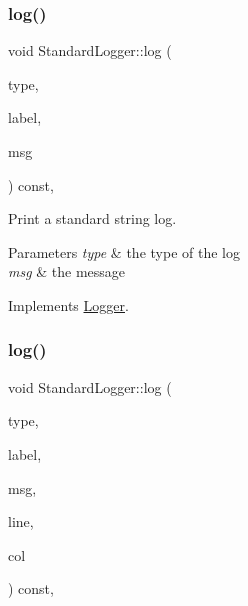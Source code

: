 \subsubsection{\texorpdfstring{log()}{log()}\hspace{0.1cm}{\footnotesize\ttfamily [1/2]}}
{\footnotesize\ttfamily void Standard\+Logger\+::log (\begin{DoxyParamCaption}\item[{const \mbox{\hyperlink{class_logger_acd39cb578d7a6750c959f2fad38d8db6}{Logger\+::\+Type}} \&}]{type,  }\item[{const std\+::string \&}]{label,  }\item[{const std\+::string \&}]{msg }\end{DoxyParamCaption}) const\hspace{0.3cm}{\ttfamily [inline]}, {\ttfamily [virtual]}}



Print a standard string log. 


\begin{DoxyParams}{Parameters}
{\em type} & the type of the log \\
\hline
{\em msg} & the message \\
\hline
\end{DoxyParams}


Implements \mbox{\hyperlink{class_logger_a124934c1b2661b229aca0493f7ec5f30}{Logger}}.

\mbox{\label{class_standard_logger_a4e63f888143cf77d576056b626f8de00}} 
\subsubsection{\texorpdfstring{log()}{log()}\hspace{0.1cm}{\footnotesize\ttfamily [2/2]}}
{\footnotesize\ttfamily void Standard\+Logger\+::log (\begin{DoxyParamCaption}\item[{const \mbox{\hyperlink{class_logger_acd39cb578d7a6750c959f2fad38d8db6}{Logger\+::\+Type}} \&}]{type,  }\item[{const std\+::string \&}]{label,  }\item[{const std\+::string \&}]{msg,  }\item[{int}]{line,  }\item[{int}]{col }\end{DoxyParamCaption}) const\hspace{0.3cm}{\ttfamily [inline]}, {\ttfamily [virtual]}}



